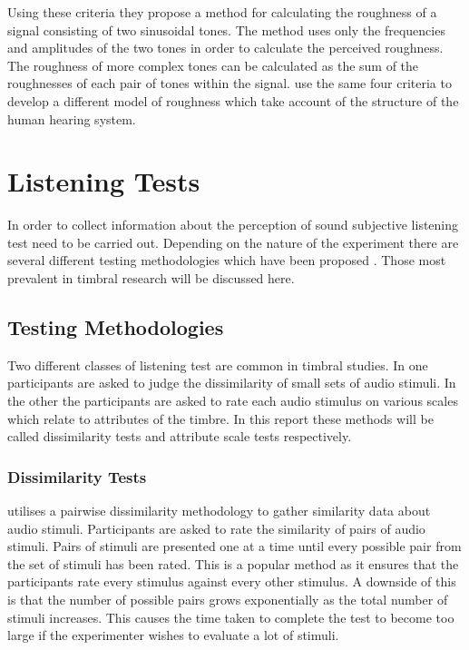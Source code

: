 		Using these criteria they propose a method for calculating the roughness of a signal consisting of two
		sinusoidal tones. The method uses only the frequencies and amplitudes of the two tones in order to
		calculate the perceived roughness. The roughness of more complex tones can be calculated as the sum of the
		roughnesses of each pair of tones within the signal. \citet{fastl2007psychoacoustics} use the same four
		criteria to develop a different model of roughness which take account of the structure of the human hearing
		system.

\section{Listening Tests}
\label{sec:Timbre-ListeningTests}
	In order to collect information about the perception of sound subjective listening test need to be carried out.
	Depending on the nature of the experiment there are several different testing methodologies which have been
	proposed \citep{bech2006perceptual}. Those most prevalent in timbral research will be discussed here.

	\subsection{Testing Methodologies}
	\label{sec:Timbre-ListeningTests-Methods}
		Two different classes of listening test are common in timbral studies. In one participants are asked to
		judge the dissimilarity of small sets of audio stimuli. In the other the participants are asked to rate
		each audio stimulus on various scales which relate to attributes of the timbre. In this report these
		methods will be called dissimilarity tests and attribute scale tests respectively.

		\subsubsection*{Dissimilarity Tests}
			\citet{grey1977multidimensional} utilises a pairwise dissimilarity methodology to gather similarity
			data about audio stimuli. Participants are asked to rate the similarity of pairs of audio stimuli.
			Pairs of stimuli are presented one at a time until every possible pair from the set of stimuli has
			been rated. This is a popular method as it ensures that the participants rate every stimulus
			against every other stimulus. A downside of this is that the number of possible pairs grows
			exponentially as the total number of stimuli increases. This causes the time taken to complete the
			test to become too large if the experimenter wishes to evaluate a lot of stimuli.

